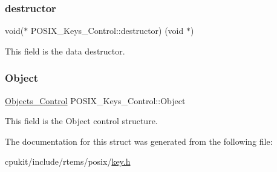 \subsubsection{\texorpdfstring{destructor}{destructor}}
{\footnotesize\ttfamily void($\ast$ P\+O\+S\+I\+X\+\_\+\+Keys\+\_\+\+Control\+::destructor) (void $\ast$)}

This field is the data destructor. \mbox{\label{structPOSIX__Keys__Control_a75ad1fd494b50ddb38e5c4e89cacfe9f}} 
\subsubsection{\texorpdfstring{Object}{Object}}
{\footnotesize\ttfamily \mbox{\hyperlink{structObjects__Control}{Objects\+\_\+\+Control}} P\+O\+S\+I\+X\+\_\+\+Keys\+\_\+\+Control\+::\+Object}

This field is the Object control structure. 

The documentation for this struct was generated from the following file\+:\begin{DoxyCompactItemize}
\item 
cpukit/include/rtems/posix/\mbox{\hyperlink{key_8h}{key.\+h}}\end{DoxyCompactItemize}
